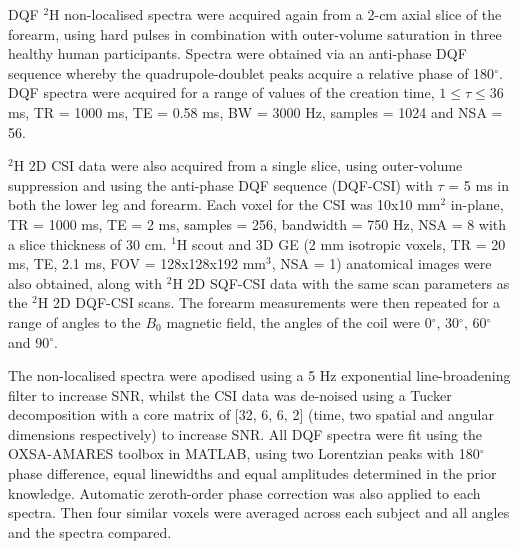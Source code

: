 \ac{DQF} $^2$H non-localised spectra were acquired again from a 2-cm axial slice of the forearm, using hard pulses in combination with outer-volume saturation in three healthy human participants. Spectra were obtained via an anti-phase \ac{DQF} sequence \cite{Sharf1995DetectionNMR-Spectroscopy} whereby the quadrupole-doublet peaks acquire a relative phase of 180$^\circ$. \ac{DQF} spectra were acquired for a range of values of the creation time, $1\leq\tau\leq36$ ms, \ac{TR} = 1000 ms, \ac{TE} = 0.58 ms, \ac{BW} = 3000 Hz, samples = 1024 and NSA = 56.

$^2$H 2D \ac{CSI} data were also acquired from a single slice, using outer-volume suppression and using the anti-phase \ac{DQF} sequence (\ac{DQF}-\ac{CSI}) with $\tau$ = 5 ms in both the lower leg and forearm. Each voxel for the \ac{CSI} was 10x10 mm$^2$ in-plane, \ac{TR} = 1000 ms, \ac{TE} = 2 ms, samples = 256, bandwidth = 750 Hz, NSA = 8 with a slice thickness of 30 cm. $^1$H scout and 3D \ac{GE} (2 mm isotropic voxels, \ac{TR} = 20 ms, \ac{TE}, 2.1 ms, \ac{FOV} = 128x128x192 mm$^3$, NSA = 1) anatomical images were also obtained, along with $^2$H 2D \ac{SQF}-\ac{CSI} data with the same scan parameters as the $^2$H 2D \ac{DQF}-\ac{CSI} scans. The forearm measurements were then repeated for a range of angles to the $B_0$ magnetic field, the angles of the coil were 0$^\circ$, 30$^\circ$, 60$^\circ$ and 90$^\circ$. 

The non-localised spectra were apodised using a 5 Hz exponential line-broadening filter to increase \ac{SNR}, whilst the \ac{CSI} data was de-noised using a Tucker decomposition \cite{Bader2007EfficientTensors} with a core matrix of [32, 6, 6, 2] (time, two spatial and angular dimensions respectively) to increase \ac{SNR}. All \ac{DQF} spectra were fit using the OXSA-AMARES \cite{Purvis2017OXSA:MATLAB} toolbox in MATLAB, using two Lorentzian peaks with 180$^\circ$ phase difference, equal linewidths and equal amplitudes determined in the prior knowledge. Automatic zeroth-order phase correction was also applied to each spectra. Then four similar voxels were averaged across each subject and all angles and the spectra compared.

